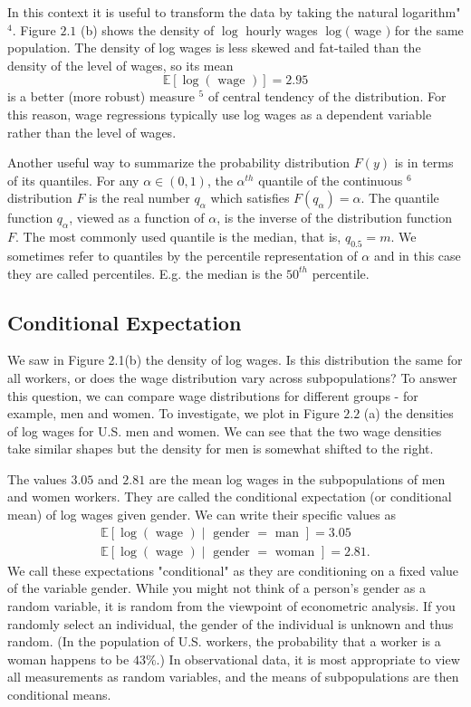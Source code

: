 \documentclass[10pt]{article}
\begin{document}
In this context it is useful to transform the data by taking the natural logarithm" ${ }^{4}$. Figure $2.1$ (b) shows the density of $\log$ hourly wages $\log ($ wage $)$ for the same population. The density of log wages is less skewed and fat-tailed than the density of the level of wages, so its mean
$$
\mathbb{E}[\log (\text { wage })]=2.95
$$
is a better (more robust) measure ${ }^{5}$ of central tendency of the distribution. For this reason, wage regressions typically use log wages as a dependent variable rather than the level of wages.

Another useful way to summarize the probability distribution $F(y)$ is in terms of its quantiles. For any $\alpha \in(0,1)$, the $\alpha^{t h}$ quantile of the continuous ${ }^{6}$ distribution $F$ is the real number $q_{\alpha}$ which satisfies $F\left(q_{\alpha}\right)=\alpha$. The quantile function $q_{\alpha}$, viewed as a function of $\alpha$, is the inverse of the distribution function $F$. The most commonly used quantile is the median, that is, $q_{0.5}=m$. We sometimes refer to quantiles by the percentile representation of $\alpha$ and in this case they are called percentiles. E.g. the median is the $50^{t h}$ percentile.

\subsection{Conditional Expectation}
We saw in Figure 2.1(b) the density of log wages. Is this distribution the same for all workers, or does the wage distribution vary across subpopulations? To answer this question, we can compare wage distributions for different groups - for example, men and women. To investigate, we plot in Figure $2.2$ (a) the densities of log wages for U.S. men and women. We can see that the two wage densities take similar shapes but the density for men is somewhat shifted to the right.

The values $3.05$ and $2.81$ are the mean log wages in the subpopulations of men and women workers. They are called the conditional expectation (or conditional mean) of log wages given gender. We can write their specific values as
$$
\begin{gathered}
\mathbb{E}[\log (\text { wage }) \mid \text { gender }=\text { man }]=3.05 \\
\mathbb{E}[\log (\text { wage }) \mid \text { gender }=\text { woman }]=2.81 .
\end{gathered}
$$
We call these expectations "conditional" as they are conditioning on a fixed value of the variable gender. While you might not think of a person's gender as a random variable, it is random from the viewpoint of econometric analysis. If you randomly select an individual, the gender of the individual is unknown and thus random. (In the population of U.S. workers, the probability that a worker is a woman happens to be $43 \%$.) In observational data, it is most appropriate to view all measurements as random variables, and the means of subpopulations are then conditional means.
\end{document}
